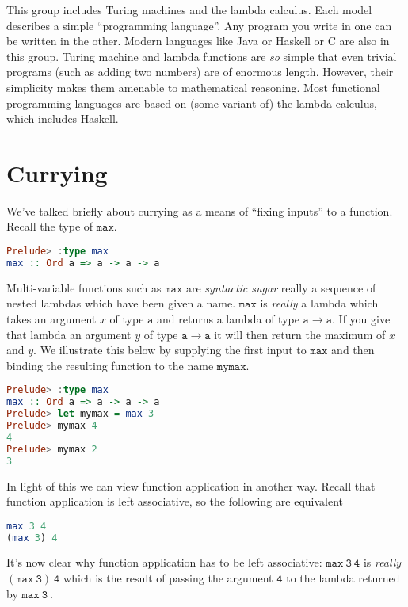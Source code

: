\documentclass[a4paper,12pt]{article}
\newcommand{\kwa}[1]{\mathtt{#1}}
\newcommand{\kw}[1]{\kwa{#1}~}
\begin{document}
\noindent
This group includes Turing machines and the lambda calculus. Each model describes a simple ``programming language''. Any program you write in one can be written in the other. Modern languages like Java or Haskell or C are also in this group. Turing machine and lambda functions are \textit{so} simple that even trivial programs (such as adding two numbers) are of enormous length. However, their simplicity makes them amenable to mathematical reasoning. Most functional programming languages are based on (some variant of) the lambda calculus, which includes Haskell. \\

\section{Currying}

\noindent
We've talked briefly about currying as a means of ``fixing inputs'' to a function. Recall the type of $\kwa{max}$.

\begin{lstlisting}[language=Haskell]
Prelude> :type max
max :: Ord a => a -> a -> a
\end{lstlisting}

\noindent
Multi-variable functions such as $\kwa{max}$ are \textit{syntactic sugar} really a sequence of nested lambdas which have been given a name. $\kwa{max}$ is \textit{really} a lambda which takes an argument $x$ of type $\kwa{a}$ and returns a lambda of type $\kwa{a \rightarrow a}$. If you give that lambda an argument $y$ of type $\kwa{a \rightarrow a}$ it will then return the maximum of $x$ and $y$. We illustrate this below by supplying the first input to $\kwa{max}$ and then binding the resulting function to the name $\kwa{mymax}$.

\begin{lstlisting}[language=Haskell]
Prelude> :type max
max :: Ord a => a -> a -> a
Prelude> let mymax = max 3
Prelude> mymax 4
4
Prelude> mymax 2
3
\end{lstlisting}

\noindent
In light of this we can view function application in another way. Recall that function application is left associative, so the following are equivalent

\begin{lstlisting}[language=Haskell]
max 3 4
(max 3) 4
\end{lstlisting}

\noindent
It's now clear why function application has to be left associative: $\kwa{max~3~4}$ is \textit{really} $\kwa{(max~3)~4}$ which is the result of passing the argument $\kwa{4}$ to the lambda returned by $\kw{max~3}$. \\
\end{document}

